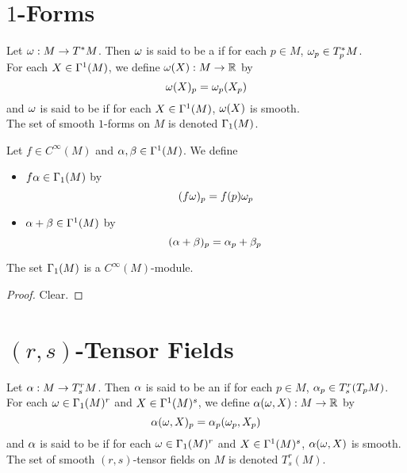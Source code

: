 \documentclass{book}
\begin{document}
	
	
	
	
	
	
	\newpage
	\section{$1$-Forms}
	
	\begin{defn}
		Let $\omega: M \rightarrow T^*M$. Then $\omega$ is said to be a  if for each $p \in M$, $\omega_p \in T^*_p M$. \\
		For each $X \in \Gamma^1(M)$, we define $\omega(X) : M \rightarrow \mathbb{R}$ by $$\omega(X)_p = \omega_p(X_p)$$
		and $\omega$ is said to be  if for each $X \in \Gamma^1(M)$, $\omega(X)$ is smooth. \\
		The set of smooth $1$-forms on $M$ is denoted $\Gamma_1(M)$.\\
	\end{defn}

	\begin{defn}
	Let $f \in C^{\infty}(M)$ and $\alpha,\beta \in \Gamma^1(M)$. We define 
	\begin{itemize}
	\item $f\alpha \in \Gamma_1(M)$ by $$(f\omega)_p = f(p)\omega_p$$
	\item $\alpha+\beta \in \Gamma^1(M)$ by $$(\alpha+\beta)_p = \alpha_p+\beta_p$$
	\end{itemize}
	\end{defn}
	
	\begin{ex}
	The set $\Gamma_1(M)$ is a $C^{\infty}(M)$-module.
	\end{ex}
	
	\begin{proof}
	Clear.
	\end{proof}
	
	
	\begin{ex}
	
	\end{ex}
	
	
	
	
	
	
	
	
	\newpage
	\section{$(r,s)$-Tensor Fields}
	
	\begin{defn}
		Let $\alpha: M \rightarrow T^r_sM$. Then $\alpha$ is said to be an  if for each $p \in M$, $\alpha_p \in T^r_s(T_pM)$. \\
		For each $\omega \in \Gamma_1(M)^r$ and $X \in \Gamma^1(M)^s$, we define $\alpha(\omega, X) : M \rightarrow \mathbb{R}$ by $$\alpha(\omega, X)_p = \alpha_p(\omega_p, X_p)$$
		and $\alpha$ is said to be  if for each $\omega \in \Gamma_1(M)^r$ and $X \in \Gamma^1(M)^s$, $\alpha(\omega, X)$ is smooth. \\
		The set of smooth $(r,s)$-tensor fields on $M$ is denoted $T^r_s(M)$.\\
	\end{defn}
\end{document}
